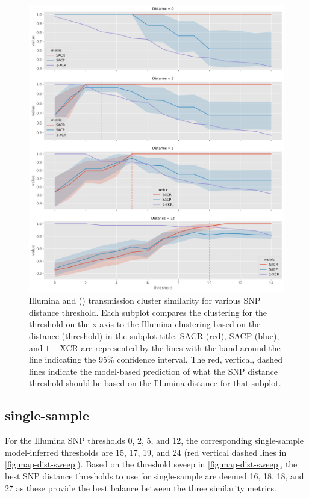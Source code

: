 \begin{figure}
\begin{center}
\includegraphics[width=0.90\columnwidth]{Appendix1/Figs/bcftools-threshold-sweep.png}
\caption{{Illumina and \ont{} (\bcftools{}) transmission cluster similarity for various SNP distance threshold. Each subplot compares the \ont{} clustering for the threshold on the x-axis to the Illumina clustering based on the distance (threshold) in the subplot title. SACR (red), SACP (blue), and $1-$XCR are represented by the lines with the band around the line indicating the 95\% confidence interval. The red, vertical, dashed lines indicate the model-based prediction of what the \ont{} SNP distance threshold should be based on the Illumina distance for that subplot.
{\label{fig:bcftools-dist-sweep}}%
}}
\end{center}
\end{figure}

\subsection{\pandora{} single-sample}

For the Illumina SNP thresholds 0, 2, 5, and 12, the corresponding \pandora{} single-sample model-inferred thresholds are 15, 17, 19, and 24 (red vertical dashed lines in \autoref{fig:map-dist-sweep}). Based on the threshold sweep in \autoref{fig:map-dist-sweep}, the best SNP distance thresholds to use for \pandora{} single-sample are deemed 16, 18, 18, and 27 as these provide the best balance between the three similarity metrics.

